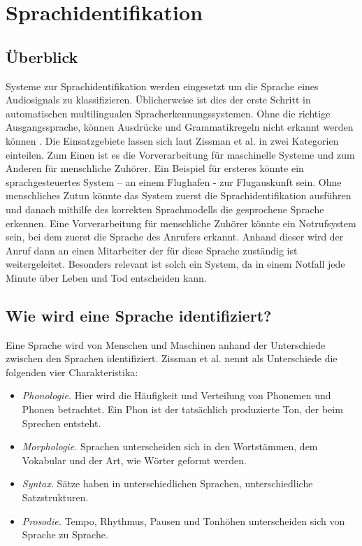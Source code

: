 \section{Sprachidentifikation}
\subsection{Überblick}
Systeme zur Sprachidentifikation werden eingesetzt um die Sprache eines Audiosignals zu klassifizieren. Üblicherweise ist dies der erste Schritt in automatischen multilingualen Spracherkennungssystemen.
Ohne die richtige Ausgangssprache, können Ausdrücke und Grammatikregeln nicht erkannt werden können \cite{Bartz.2017}.
Die Einsatzgebiete lassen sich laut Zissman et al. \cite{Zissman.2001} in zwei Kategorien einteilen. Zum Einen ist es die Vorverarbeitung für maschinelle Systeme und zum Anderen für menschliche Zuhörer. Ein Beispiel für ersteres könnte ein sprachgesteuertes System – an einem Flughafen - zur Flugauskunft sein. Ohne menschliches Zutun könnte das System zuerst die Sprachidentifikation ausführen und danach mithilfe des korrekten Sprachmodells die gesprochene Sprache erkennen.
Eine Vorverarbeitung für menschliche Zuhörer könnte ein Notrufsystem sein, bei dem zuerst die Sprache des Anrufers erkannt. Anhand dieser wird der Anruf dann an einen Mitarbeiter der für diese Sprache zuständig ist weitergeleitet. Besonders relevant ist solch ein System, da in einem Notfall jede Minute über Leben und Tod entscheiden kann.

\subsection{Wie wird eine Sprache identifiziert?}
Eine Sprache wird von Menschen und Maschinen anhand der Unterschiede zwischen den Sprachen identifiziert. Zissman et al. \cite{Zissman.2001} nennt als Unterschiede die folgenden vier Charakteristika:
\begin{itemize}
\item \textit{Phonologie.} Hier wird die Häufigkeit und Verteilung von Phonemen und Phonen betrachtet. Ein Phon ist der tatsächlich produzierte Ton, der beim Sprechen entsteht.
\item \textit{Morphologie.} Sprachen unterscheiden sich in den Wortstämmen, dem Vokabular und der Art, wie Wörter geformt werden.
\item \textit{Syntax.} Sätze haben in unterschiedlichen Sprachen, unterschiedliche Satzstrukturen.
\item \textit{Prosodie.} Tempo, Rhythmus, Pausen und Tonhöhen unterscheiden sich von Sprache zu Sprache.
\end{itemize}

